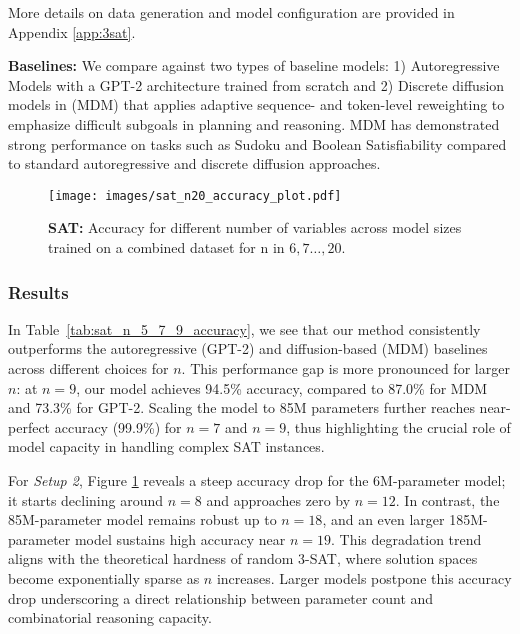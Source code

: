 More details on data generation and model configuration are provided in Appendix \ref{app:3sat}.

\textbf{Baselines:}
We compare against two types of baseline models: 1) Autoregressive Models with a GPT-2 architecture \cite{radford2019language} trained from scratch and 2) Discrete diffusion models in \cite{ye2024autoregressiondiscretediffusioncomplex} (MDM) that applies adaptive sequence- and token-level reweighting to emphasize difficult subgoals in planning and reasoning. MDM has demonstrated strong performance on tasks such as Sudoku and Boolean Satisfiability compared to standard autoregressive and discrete diffusion approaches.




\begin{figure}[t]
  \centering
  \texttt{[image: images/sat\_n20\_accuracy\_plot.pdf]}
  \caption{\textbf{SAT:} Accuracy for different number of variables across model sizes trained on a combined dataset for n in $6,7\dots,20$.}
  \label{fig:sat_n20_accuracy_plot}
\end{figure}

\subsubsection{Results}
In Table~\ref{tab:sat_n_5_7_9_accuracy}, we see that our method consistently outperforms the autoregressive (GPT-2) and diffusion-based (MDM) baselines across different choices for $n$. This performance gap is more pronounced for larger $n$: at $n=9$, our model achieves 94.5\% accuracy, compared to 87.0\% for MDM and 73.3\% for GPT-2. Scaling the model to 85M parameters further reaches near-perfect accuracy (99.9\%) for $n=7$ and $n=9$, thus highlighting the crucial role of model capacity in handling complex SAT instances.

For \emph{Setup 2}, Figure \ref{fig:sat_n20_accuracy_plot} reveals a steep accuracy drop for the 6M-parameter model; it starts declining around $n = 8$ and approaches zero by $n = 12$. In contrast, the 85M-parameter model remains robust up to $n = 18$, and an even larger 185M-parameter model sustains high accuracy near $n = 19$. This degradation trend aligns with the theoretical hardness of random 3-SAT, where solution spaces become exponentially sparse as $n$ increases. Larger models postpone this accuracy drop underscoring a direct relationship between parameter count and combinatorial reasoning capacity.
